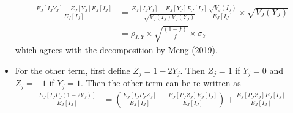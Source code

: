 \documentclass[12pt]{article}
\numberwithin{equation}{section}
\theoremstyle{plain}
\begin{document}
\begin{itemize}
$$\begin{aligned}
\frac{E_J [I_J Y_J]- E_J[Y_J] E_J[I_J]}{E_J[I_J]} &=  \frac{E_J [I_J Y_J]- E_J[Y_J] E_J[I_J]}{\sqrt{V_J(I_J) V_J(Y_J)}} \frac{\sqrt{V_J(I_J)}}{E_J[I_J]} \times \sqrt{V_J(Y_J)} \\
&= \rho_{I,Y} \times \sqrt{\frac{(1-f)}{f}} \times \sigma_Y
\end{aligned}
$$
which agrees with the decomposition by Meng (2019).
\item For the other term, first define $Z_j = 1 - 2 Y_j $. Then $Z_j = 1$ if $Y_j = 0$ and $Z_j = -1$ if $Y_j = 1$. Then the other term can be re-written as
$$
\begin{aligned}
\frac{E_J \left[ I_J P_J (1-2Y_J) \right]}{E_J [ I_J ] } &= \left( \frac{E_J \left[ I_J P_J Z_J \right]}{E_J [ I_J ] } -  \frac{E_J \left[ P_J Z_J \right] E_J[ I_J]}{E_J [ I_J ] } \right) +  \frac{E_J \left[ P_J Z_J \right] E_J[ I_J]}{E_J [ I_J ] } \\
\end{aligned}
$$


\end{itemize}
\end{document}
